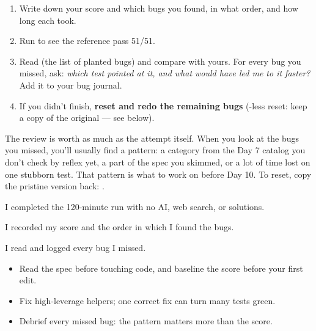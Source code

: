 \documentclass[10pt,a4paper]{article}
\begin{document}
\begin{enumerate}
\item Write down your score and which bugs you found, in what order, and how long each took.
\item Run  to see the reference pass 51/51.
\item Read  (the list of planted bugs) and compare with yours. For every bug you missed, ask: \emph{which test pointed at it, and what would have led me to it faster?} Add it to your bug journal.
\item If you didn’t finish, \textbf{reset and redo the remaining bugs} (-less reset: keep a copy of the original — see below).
\end{enumerate}
The review is worth as much as the attempt itself. When you look at the bugs you missed, you’ll usually find a pattern: a category from the Day 7 catalog you don’t check by reflex yet, a part of the spec you skimmed, or a lot of time lost on one stubborn test. That pattern is what to work on before Day 10.
To reset, copy the pristine version back: .
\begin{checklistbox}
\begin{checklist}
\item I completed the 120-minute run with no AI, web search, or solutions.
\item I recorded my score and the order in which I found the bugs.
\item I read  and logged every bug I missed.
\end{checklist}
\scoreline
\end{checklistbox}
\begin{examlensbox}
\begin{itemize}
\item Read the spec before touching code, and baseline the score before your first edit.
\item Fix high-leverage helpers; one correct fix can turn many tests green.
\item Debrief every missed bug: the pattern matters more than the score.
\end{itemize}
\end{examlensbox}
\bugjournalifspace
\end{document}
